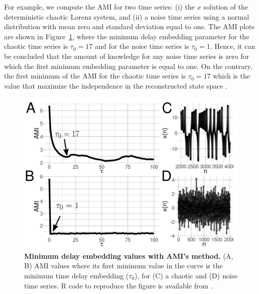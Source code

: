 For example, we compute the AMI for two time series:
(i) the $x$ solution of the deterministic chaotic Lorenz system, and 
(ii) a noise time series using a normal distribution with mean zero and 
standard deviation equal to one. The AMI plots are shown in 
Figure~\ref{fig:amis}, where the minimum delay embedding parameter for 
the chaotic time series is $\tau_0=17$ and for the noise time series is  
$\tau_0=1$. Hence, it can be concluded that the amount of knowledge for 
any noise time series is zero for which the first minimum embedding 
parameter is equal to one. On the contrary, the first minimum of the AMI 
for the chaotic time series is $\tau_0=17$ which is the value that maximize 
the independence in the reconstructed state space \citep{bradley2015}.
\begin{figure}[!h]
  \centering
  \includegraphics[width=1.0\textwidth]{ami}
    \caption{
	{\bf Minimum delay embedding values with AMI's method.} 
    	(A, B) AMI values where its first minimum value in the curve
	is the minimum time delay embedding ($\tau_0$), 
	for (C) a chaotic and (D) noise time series.
	R code to reproduce the figure is available from \cite{hwum2018}.
        }
    \label{fig:amis}
\end{figure}

